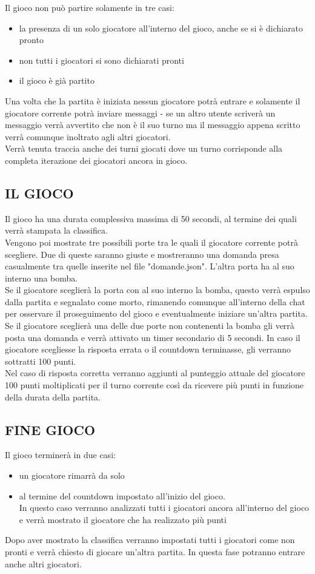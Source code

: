 \documentclass[a4paper,12pt]{report}
\begin{document}
Il gioco non può partire solamente in tre casi:
\begin{itemize}
	\item la presenza di un solo giocatore all'interno del gioco, anche se si è dichiarato pronto
	\item non tutti i giocatori si sono dichiarati pronti
	\item il gioco è già partito
\end{itemize}
Una volta che la partita è iniziata nessun giocatore potrà entrare e solamente il giocatore corrente potrà inviare messaggi - se un altro utente scriverà un messaggio verrà avvertito che non è il suo turno ma il messaggio appena scritto verrà comunque inoltrato agli altri giocatori.\\
Verrà tenuta traccia anche dei turni giocati dove un turno corrisponde alla completa iterazione dei giocatori ancora in gioco.\clearpage

\subsection{IL GIOCO}
Il gioco ha una durata complessiva massima di 50 secondi, al termine dei quali verrà stampata la classifica.\\
Vengono poi mostrate tre possibili porte tra le quali il giocatore corrente potrà scegliere. Due di queste saranno giuste e mostreranno una domanda presa casualmente tra quelle inserite nel file "domande.json". L'altra porta ha al suo interno una bomba.\\
Se il giocatore sceglierà la porta con al suo interno la bomba, questo verrà espulso dalla partita e segnalato come morto, rimanendo comunque all'interno della chat per osservare il proseguimento del gioco e eventualmente iniziare un'altra partita.\\
Se il giocatore sceglierà una delle due porte non contenenti la bomba gli verrà posta una domanda e verrà attivato un timer secondario di 5 secondi. In caso il giocatore scegliesse la risposta errata o il countdown terminasse, gli verranno sottratti 100 punti.\\
Nel caso di risposta corretta verranno aggiunti al punteggio attuale del giocatore 100 punti moltiplicati per il turno corrente così da ricevere più punti in funzione della durata della partita.\\

\subsection{FINE GIOCO}
Il gioco terminerà in due casi:
\begin{itemize}
	\item un giocatore rimarrà da solo 
	\item al termine del countdown impostato all'inizio del gioco.\\ In questo caso verranno analizzati tutti i giocatori ancora all'interno del gioco e verrà mostrato il giocatore che ha realizzato più punti
\end{itemize}
Dopo aver mostrato la classifica verranno impostati tutti i giocatori come non pronti e verrà chiesto di giocare un'altra partita. In questa fase potranno entrare anche altri giocatori.\clearpage
\end{document}
